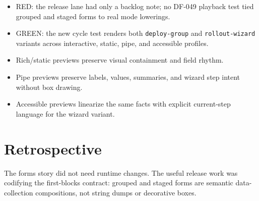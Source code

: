 \begin{itemize}
\tightlist
\item
  RED: the release lane had only a backlog note; no DF-049 playback test tied grouped and staged forms to real mode lowerings.
\item
  GREEN: the new cycle test renders both \texttt{d\allowbreak{}e\allowbreak{}p\allowbreak{}l\allowbreak{}o\allowbreak{}y\allowbreak{}-\allowbreak{}g\allowbreak{}r\allowbreak{}o\allowbreak{}u\allowbreak{}p} and \texttt{r\allowbreak{}o\allowbreak{}l\allowbreak{}l\allowbreak{}o\allowbreak{}u\allowbreak{}t\allowbreak{}-\allowbreak{}w\allowbreak{}i\allowbreak{}z\allowbreak{}a\allowbreak{}r\allowbreak{}d} variants across interactive, static, pipe, and accessible profiles.
\item
  Rich/static previews preserve visual containment and field rhythm.
\item
  Pipe previews preserve labels, values, summaries, and wizard step intent without box drawing.
\item
  Accessible previews linearize the same facts with explicit current-step language for the wizard variant.
\end{itemize}

\section{Retrospective}\label{record-097-retrospective}

The forms story did not need runtime changes. The useful release work was codifying the first-blocks contract: grouped and staged forms are semantic data-collection compositions, not string dumps or decorative boxes.

